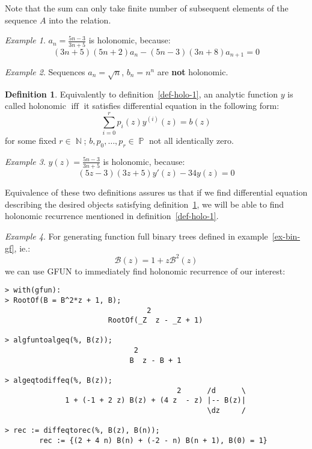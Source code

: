 \documentclass[final]{article}
\theoremstyle{definition}
\newtheorem{definition}{Definition}[subsection]
\theoremstyle{remark}
\newtheorem{example}{Example}[subsection]
\newcommand{\gf}[1]{\ensuremath{\mathcal{#1}}}
\DeclareMathOperator{\textiff}{\text{iff}}
\DeclareMathOperator{\N}{\mathbb{N}}
\DeclareMathOperator{\poly}{\mathbb{P}}
\begin{document}
Note that the sum can only take finite number of subsequent elements of the sequence \(A\) into the relation.

\begin{example}
    \(a_n = \frac{5n - 3}{3n + 5}\) is holonomic, because:
    \[(3n + 5)(5n + 2) a_n - (5n - 3)(3n + 8) a_{n+1} = 0\]
\end{example}

\begin{example}
    Sequences \(a_n = \sqrt{n}\), \(b_n = n^n\) are \textbf{not} holonomic.
\end{example}

\begin{definition}
    \label{def-holo-2}
    \cite{holotoolkit, complexity}
    Equivalently to definition\ \ref{def-holo-1}, an analytic function \(y\) is called holonomic \(\textiff\) it satisfies differential equation in the following form:
    \[\sum_{i=0}^{r} p_i(z) y^{(i)}(z) = b(z)\]
    for some fixed \(r \in \N\); \(b, p_0, \ldots, p_r \in \poly\) not all identically zero.
\end{definition}

\begin{example}
    \(y(z) = \frac{5n - 3}{3n + 5}\) is holonomic, because:
    \[(5z-3)(3z+5)y'(z) - 34y(z) = 0\]
\end{example}

Equivalence of these two definitions assures us that if we find differential equation describing the desired objects satisfying definition\ \ref{def-holo-2}, we will be able to find holonomic recurrence mentioned in definition\ \ref{def-holo-1}.

\begin{example}
    For generating function full binary trees defined in example\ \ref{ex-bin-gf}, ie.:
    \[\gf{B}(z) = 1 + z\gf{B}^2(z)\]
    we can use GFUN\cite{gfun} to immediately find holonomic recurrence of our interest:

    \begin{lstlisting}
> with(gfun):
> RootOf(B = B^2*z + 1, B);
                                 2
                        RootOf(_Z  z - _Z + 1)

> algfuntoalgeq(%, B(z));
                              2
                             B  z - B + 1

> algeqtodiffeq(%, B(z));
                                        2      /d      \
              1 + (-1 + 2 z) B(z) + (4 z  - z) |-- B(z)|
                                               \dz     /

> rec := diffeqtorec(%, B(z), B(n));
        rec := {(2 + 4 n) B(n) + (-2 - n) B(n + 1), B(0) = 1}
    \end{lstlisting}


\end{example}
\end{document}
